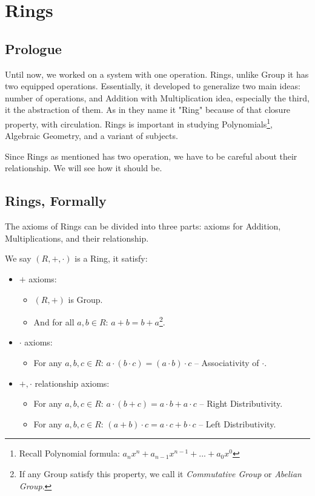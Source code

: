 \section{Rings \label{ring}}
\subsection{Prologue}
Until now, we worked on a system with one operation. Rings, unlike Group it has two equipped operations. Essentially, it developed to generalize two main ideas: number of operations, and Addition with Multiplication idea, especially the third, it the abstraction of them. As in \cite{61505} they name it "Ring" because of that closure property, with circulation. Rings is important in studying Polynomials\footnote{Recall Polynomial formula: $a_nx^n+a_{n-1}x^{n-1}+...+a_0x^{0}$}, Algebraic Geometry, and a variant of subjects.

Since Rings as mentioned has two operation, we have to be careful about their relationship. We will see how it should be.
\subsection{Rings, Formally}
The axioms of Rings can be divided into three parts: axioms for Addition, Multiplications, and their relationship.

We say $(R,+,\cdot)$ is a Ring, it satisfy:
\begin{itemize}
    \item $+$ axioms:
    \begin{itemize}
        \item $(R,+)$ is Group. 
        \item And for all $a,b \in R$: $a+b=b+a$\footnote{If any Group satisfy this property, we call it {\it Commutative Group} or {\it Abelian Group}.}.
    \end{itemize}
    \item $\cdot$ axioms:
    \begin{itemize}
        \item For any $a,b,c \in R$: $a \cdot (b \cdot c) = (a \cdot b) \cdot c$ -- Associativity of $\cdot$.
    \end{itemize}
    
    \item $+,\cdot $ relationship axioms:
    \begin{itemize}
        \item For any $a,b,c \in R$: $a \cdot (b + c) = a \cdot b + a \cdot c$ -- Right Distributivity.
        \item For any $a,b,c \in R$: $(a + b) \cdot c = a \cdot c + b \cdot c$ -- Left Distributivity.
    \end{itemize}
\end{itemize}